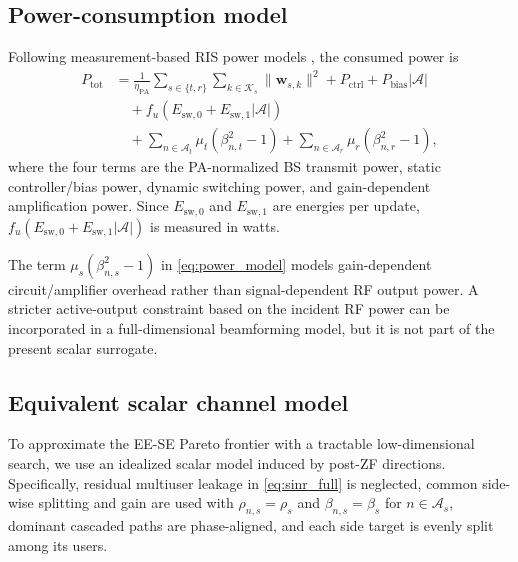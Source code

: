 \documentclass[journal]{IEEEtran}
\begin{document}
\subsection{Power-consumption model}
Following measurement-based RIS power models \cite{wang2023static,wang2024practical}, the consumed power is
\begin{equation}
\begin{aligned}
P_{\mathrm{tot}}
&=\frac{1}{\eta_{\mathrm{PA}}}
\sum_{s\in\{t,r\}}\sum_{k\in\mathcal{K}_s}\|\mathbf{w}_{s,k}\|^2
+P_{\mathrm{ctrl}}+P_{\mathrm{bias}}|\mathcal{A}|  \\
&\quad +f_u\!\left(E_{\mathrm{sw},0}+E_{\mathrm{sw},1}|\mathcal{A}|\right) \\
&\quad +\sum_{n\in\mathcal{A}_t}\mu_t(\beta_{n,t}^2-1)
+\sum_{n\in\mathcal{A}_r}\mu_r(\beta_{n,r}^2-1),
\end{aligned}
\label{eq:power_model}
\end{equation}
where the four terms are the PA-normalized BS transmit power, static controller/bias power, dynamic switching power, and gain-dependent amplification power. Since $E_{\mathrm{sw},0}$ and $E_{\mathrm{sw},1}$ are energies per update, $f_u(E_{\mathrm{sw},0}+E_{\mathrm{sw},1}|\mathcal{A}|)$ is measured in watts.

The term $\mu_s(\beta_{n,s}^2-1)$ in \eqref{eq:power_model} models gain-dependent circuit/amplifier overhead rather than signal-dependent RF output power. A stricter active-output constraint based on the incident RF power can be incorporated in a full-dimensional beamforming model, but it is not part of the present scalar surrogate.

\subsection{Equivalent scalar channel model}
To approximate the EE-SE Pareto frontier with a tractable low-dimensional search, we use an idealized scalar model induced by post-ZF directions. Specifically, residual multiuser leakage in \eqref{eq:sinr_full} is neglected, common side-wise splitting and gain are used with $\rho_{n,s}=\rho_s$ and $\beta_{n,s}=\beta_s$ for $n\in\mathcal{A}_s$, dominant cascaded paths are phase-aligned, and each side target is evenly split among its users.
\end{document}
